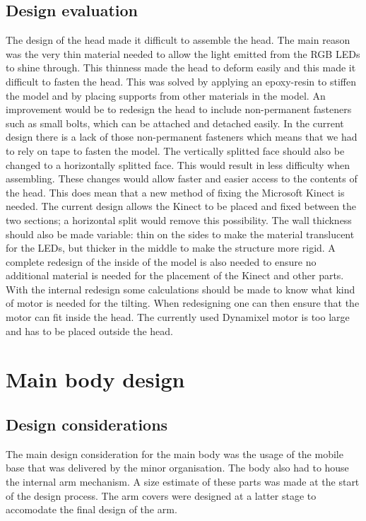 \documentclass[technical_document.tex]{subfiles}
\begin{document}
\subsection*{Design evaluation}
The design of the head made it difficult to assemble the head. The main reason was the very thin material needed to allow the light emitted from the RGB LEDs to shine through. This thinness made the head to deform easily and this made it difficult to fasten the head. This was solved by applying an epoxy-resin to stiffen the model and by placing supports from other materials in the model. An improvement would be to redesign the head to include non-permanent fasteners such as small bolts, which can be attached and detached easily. In the current design there is a lack of those non-permanent fasteners which means that we had to rely on tape to fasten the model. The vertically splitted face should also be changed to a horizontally splitted face. This would result in less difficulty when assembling. These changes would allow faster and easier access to the contents of the head. This does mean that a new method of fixing the Microsoft Kinect is needed. The current design allows the Kinect to be placed and fixed between the two sections; a horizontal split would remove this possibility. The wall thickness should also be made variable: thin on the sides to make the material translucent for the LEDs, but thicker in the middle to make the structure more rigid. A complete redesign of the inside of the model is also needed to ensure no additional material is needed for the placement of the Kinect and other parts. With the internal redesign some calculations should be made to know what kind of motor is needed for the tilting. When redesigning one can then ensure that the motor can fit inside the head. The currently used Dynamixel motor is too large and has to be placed outside the head.

\section*{Main body design}
\subsection*{Design considerations}
The main design consideration for the main body was the usage of the mobile base that was delivered by the minor organisation. The body also had to house the internal arm mechanism. A size estimate of these parts was made at the start of the design process. The arm covers were designed at a latter stage to accomodate the final design of the arm.
\end{document}
